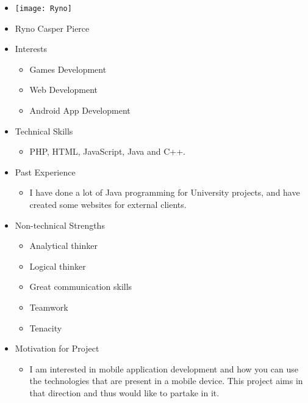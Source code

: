 
\begin{itemize}
	\item[] \texttt{[image: Ryno]}
	\item[] Ryno Casper Pierce
	\item Interests
	\begin{itemize}
		\item Games Development
		\item Web Development
		\item Android App Development
	\end{itemize}
	\item Technical Skills
	\begin{itemize}
		\item[] PHP, HTML, JavaScript, Java and C++.
	\end{itemize}
	\item Past Experience
	\begin{itemize}
		\item[] I have done a lot of Java programming for University projects, and have created some websites for external clients.
	\end{itemize}
	\item Non-technical Strengths
	\begin{itemize}
		\item Analytical thinker
		\item Logical thinker
		\item Great communication skills
		\item Teamwork
		\item Tenacity
	\end{itemize}
	\item Motivation for Project
	\begin{itemize}
		\item[] I am interested in mobile application development and how you can use the technologies that are present in a mobile device. This project aims in that direction and thus would like to partake in it.
	\end{itemize}
\end{itemize}